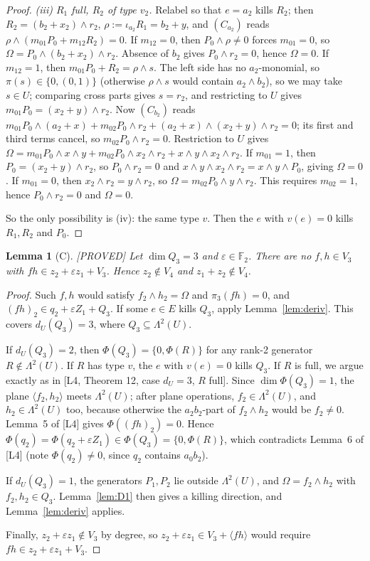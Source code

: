 \documentclass[11pt,a4paper]{article}
\theoremstyle{plain}
\newtheorem{lemma}[theorem]{Lemma}
\theoremstyle{definition}
\theoremstyle{remark}
\newcommand{\F}{\mathbb{F}_2}
\newcommand{\Lam}{\Lambda^{2}}
\newcommand{\dU}{d_U}
\newcommand{\status}[1]{\hfill\textsf{[#1]}}
\begin{document}
\begin{proof}
\emph{(iii) $R_1$ full, $R_2$ of type $v_2$.} Relabel so that $e=a_2$ kills $R_2$; then $R_2=(b_2+x_2)\wedge r_2$, $\rho:=\iota_{a_2}R_1=b_2+y$, and $(C_{a_2})$ reads $\rho\wedge(m_{01}P_0+m_{12}R_2)=0$.
If $m_{12}=0$, then $P_0\wedge\rho\neq0$ forces $m_{01}=0$, so $\Omega=P_0\wedge(b_2+x_2)\wedge r_2$. Absence of $b_2$ gives $P_0\wedge r_2=0$, hence $\Omega=0$.
If $m_{12}=1$, then $m_{01}P_0+R_2=\rho\wedge s$. The left side has no $a_2$-monomial, so $\pi(s)\in\{0,(0,1)\}$ (otherwise $\rho\wedge s$ would contain $a_2\wedge b_2$), so we may take $s\in U$; comparing cross parts gives $s=r_2$, and restricting to $U$ gives $m_{01}P_0=(x_2+y)\wedge r_2$. Now $(C_{b_2})$ reads $m_{01}P_0\wedge(a_2+x)+m_{02}P_0\wedge r_2+(a_2+x)\wedge(x_2+y)\wedge r_2=0$; its first and third terms cancel, so $m_{02}P_0\wedge r_2=0$. Restriction to $U$ gives $\Omega=m_{01}P_0\wedge x\wedge y+m_{02}P_0\wedge x_2\wedge r_2+x\wedge y\wedge x_2\wedge r_2$.
If $m_{01}=1$, then $P_0=(x_2+y)\wedge r_2$, so $P_0\wedge r_2=0$ and $x\wedge y\wedge x_2\wedge r_2=x\wedge y\wedge P_0$, giving $\Omega=0$.
If $m_{01}=0$, then $x_2\wedge r_2=y\wedge r_2$, so $\Omega=m_{02}P_0\wedge y\wedge r_2$. This requires $m_{02}=1$, hence $P_0\wedge r_2=0$ and $\Omega=0$.

So the only possibility is (iv): the same type $v$. Then the $e$ with $v(e)=0$ kills $R_1,R_2$ and $P_0$.
\end{proof}

\begin{lemma}[C]\label{lem:C}\status{PROVED}
Let $\dim Q_3=3$ and $\varepsilon\in\F$. There are no $f,h\in V_3$ with $fh\in z_2+\varepsilon z_1+V_3$. Hence $z_2\notin V_4$ and $z_1+z_2\notin V_4$.
\end{lemma}

\begin{proof}
Such $f,h$ would satisfy $f_2\wedge h_2=\Omega$ and $\pi_3(fh)=0$, and $(fh)_2\in q_2+\varepsilon Z_1+Q_3$. If some $e\in E$ kills $Q_3$, apply Lemma~\ref{lem:deriv}. This covers $\dU(Q_3)=3$, where $Q_3\subseteq\Lam(U)$.

If $\dU(Q_3)=2$, then $\Phi(Q_3)=\{0,\Phi(R)\}$ for any rank-2 generator $R\notin\Lam(U)$. If $R$ has type $v$, the $e$ with $v(e)=0$ kills $Q_3$. If $R$ is full, we argue exactly as in [L4, Theorem 12, case $\dU=3$, $R$ full]. Since $\dim\Phi(Q_3)=1$, the plane $\langle f_2,h_2\rangle$ meets $\Lam(U)$; after plane operations, $f_2\in\Lam(U)$, and $h_2\in\Lam(U)$ too, because otherwise the $a_2b_2$-part of $f_2\wedge h_2$ would be $f_2\neq0$. Lemma~5 of [L4] gives $\Phi((fh)_2)=0$. Hence $\Phi(q_2)=\Phi(q_2+\varepsilon Z_1)\in\Phi(Q_3)=\{0,\Phi(R)\}$, which contradicts Lemma~6 of [L4] (note $\Phi(q_2)\neq0$, since $q_2$ contains $a_0b_2$).

If $\dU(Q_3)=1$, the generators $P_1,P_2$ lie outside $\Lam(U)$, and $\Omega=f_2\wedge h_2$ with $f_2,h_2\in Q_3$. Lemma~\ref{lem:D1} then gives a killing direction, and Lemma~\ref{lem:deriv} applies.

Finally, $z_2+\varepsilon z_1\notin V_3$ by degree, so $z_2+\varepsilon z_1\in V_3+\langle fh\rangle$ would require $fh\in z_2+\varepsilon z_1+V_3$.
\end{proof}
\end{document}
